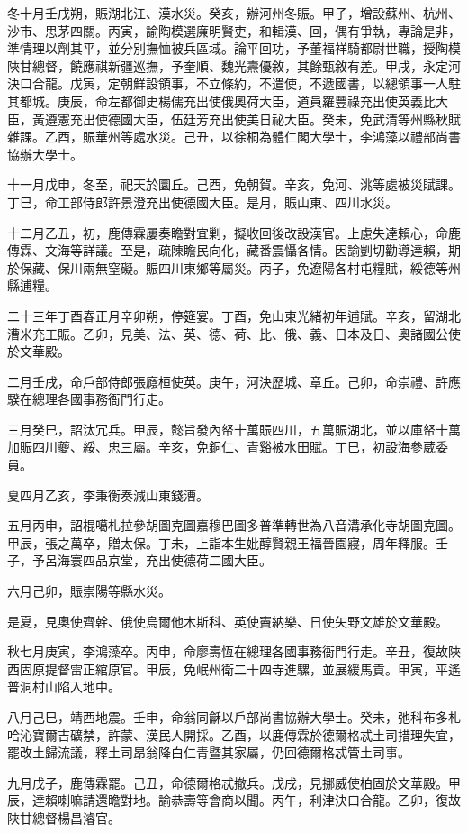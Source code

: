 \begin{pinyinscope}
冬十月壬戌朔，賑湖北江、漢水災。癸亥，辦河州冬賑。甲子，增設蘇州、杭州、沙市、思茅四關。丙寅，諭陶模選廉明賢吏，和輯漢、回，偶有爭執，專論是非，準情理以劑其平，並分別撫恤被兵區域。論平回功，予董福祥騎都尉世職，授陶模陜甘總督，饒應祺新疆巡撫，予奎順、魏光燾優敘，其餘甄敘有差。甲戌，永定河決口合龍。戊寅，定朝鮮設領事，不立條約，不遣使，不遞國書，以總領事一人駐其都城。庚辰，命左都御史楊儒充出使俄奧荷大臣，道員羅豐祿充出使英義比大臣，黃遵憲充出使德國大臣，伍廷芳充出使美日祕大臣。癸未，免武清等州縣秋賦雜課。乙酉，賑華州等處水災。己丑，以徐桐為體仁閣大學士，李鴻藻以禮部尚書協辦大學士。

十一月戊申，冬至，祀天於圜丘。己酉，免朝賀。辛亥，免河、洮等處被災賦課。丁巳，命工部侍郎許景澄充出使德國大臣。是月，賑山東、四川水災。

十二月乙丑，初，鹿傳霖屢奏瞻對宜剿，擬收回後改設漢官。上慮失達賴心，命鹿傳霖、文海等詳議。至是，疏陳瞻民向化，藏番震懾各情。因諭剴切勸導達賴，期於保藏、保川兩無窒礙。賑四川東鄉等屬災。丙子，免遼陽各村屯糧賦，綏德等州縣逋糧。

二十三年丁酉春正月辛卯朔，停筵宴。丁酉，免山東光緒初年逋賦。辛亥，留湖北漕米充工賑。乙卯，見美、法、英、德、荷、比、俄、義、日本及日、奧諸國公使於文華殿。

二月壬戌，命戶部侍郎張廕桓使英。庚午，河決歷城、章丘。己卯，命崇禮、許應騤在總理各國事務衙門行走。

三月癸巳，詔汰冗兵。甲辰，懿旨發內帑十萬賑四川，五萬賑湖北，並以庫帑十萬加賑四川夔、綏、忠三屬。辛亥，免銅仁、青谿被水田賦。丁巳，初設海參葳委員。

夏四月乙亥，李秉衡奏減山東錢漕。

五月丙申，詔棍噶札拉參胡圖克圖嘉穆巴圖多普準轉世為八音溝承化寺胡圖克圖。甲辰，張之萬卒，贈太保。丁未，上詣本生妣醇賢親王福晉園寢，周年釋服。壬子，予呂海寰四品京堂，充出使德荷二國大臣。

六月己卯，賑崇陽等縣水災。

是夏，見奧使齊幹、俄使烏爾他木斯科、英使竇納樂、日使矢野文雄於文華殿。

秋七月庚寅，李鴻藻卒。丙申，命廖壽恆在總理各國事務衙門行走。辛丑，復故陜西固原提督雷正綰原官。甲辰，免岷州衛二十四寺進騾，並展緩馬貢。甲寅，平遙普洞村山陷入地中。

八月己巳，靖西地震。壬申，命翁同龢以戶部尚書協辦大學士。癸未，弛科布多札哈沁寶爾吉礦禁，許蒙、漢民人開採。乙酉，以鹿傳霖於德爾格忒土司措理失宜，罷改土歸流議，釋土司昂翁降白仁青暨其家屬，仍回德爾格忒管土司事。

九月戊子，鹿傳霖罷。己丑，命德爾格忒撤兵。戊戌，見挪威使柏固於文華殿。甲辰，達賴喇嘛請還瞻對地。諭恭壽等會商以聞。丙午，利津決口合龍。乙卯，復故陜甘總督楊昌濬官。


\end{pinyinscope}

